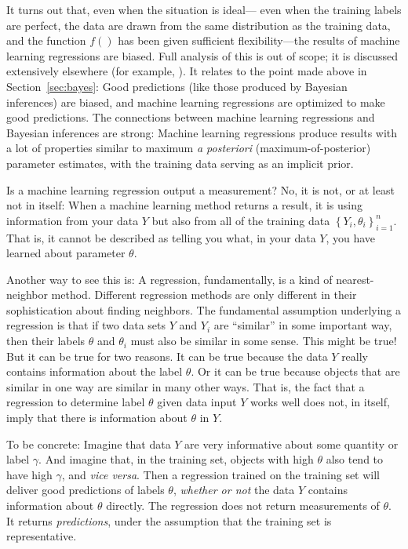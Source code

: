 \documentclass{article}
\newcommand{\sectionname}{Section}
\newcommand{\secref}[1]{\sectionname~\ref{#1}}
\newcommand{\foreign}[1]{\textsl{#1}}
\newcommand{\setof}[1]{\left\{{#1}\right\}}
\begin{document}
It turns out that, even when the situation is ideal---%
even when the training labels are perfect, the data are drawn from the same distribution as the training data, and the function $f()$ has been given sufficient flexibility---the results of machine learning regressions are biased.
Full analysis of this is out of scope; it is discussed extensively elsewhere (for example, \cite{goodorbad, ting}).
It relates to the point made above in \secref{sec:bayes}:
Good predictions (like those produced by Bayesian inferences) are biased, and machine learning regressions are optimized to make good predictions.
The connections between machine learning regressions and Bayesian inferences are strong:
Machine learning regressions produce results with a lot of properties similar to maximum \foreign{a posteriori} (maximum-of-posterior) parameter estimates, with the training data serving as an implicit prior.

Is a machine learning regression output a measurement?
No, it is not, or at least not in itself:
When a machine learning method returns a result, it is using information from your data $Y$
but also from all of the training data $\setof{Y_i, \theta_i}_{i=1}^n$.
That is, it cannot be described as telling you what, in your data $Y$, you have learned about parameter $\theta$.

Another way to see this is:
A regression, fundamentally, is a kind of nearest-neighbor method.
Different regression methods are only different in their sophistication about finding neighbors.
The fundamental assumption underlying a regression is that if two data sets $Y$ and $Y_i$ are ``similar'' in some important way, then their labels $\theta$ and $\theta_i$ must also be similar in some sense.
This might be true!
But it can be true for two reasons.
It can be true because the data $Y$ really contains information about the label $\theta$.
Or it can be true because objects that are similar in one way are similar in many other ways.
That is, the fact that a regression to determine label $\theta$ given data input $Y$ works well does not, in itself, imply that there is information about $\theta$ in $Y$.

To be concrete: Imagine that data $Y$ are very informative about some quantity or label $\gamma$.
And imagine that, in the training set, objects with high $\theta$ also tend to have high $\gamma$, and \foreign{vice versa}.
Then a regression trained on the training set will deliver good predictions of labels $\theta$, \emph{whether or not} the data $Y$ contains information about $\theta$ directly.
The regression does not return measurements of $\theta$.
It returns \emph{predictions}, under the assumption that the training set is representative.
\end{document}
